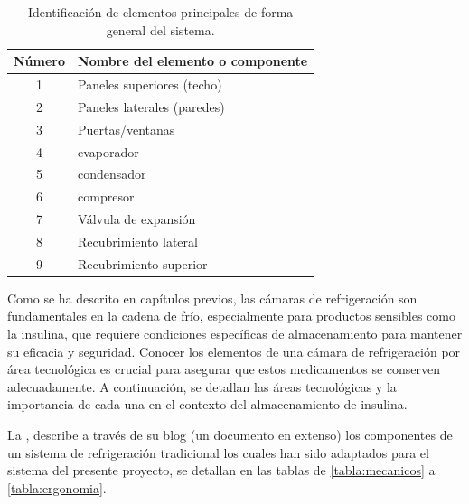 \begin{table}[H]
	\centering
	\caption{Identificación de elementos principales de forma general del sistema.}
	\begin{tabular}{@{}cl@{}}
		\toprule
		\textbf{Número}           & \textbf{Nombre del elemento o componente}           \\
		\midrule
		1                         & Paneles superiores (techo)                          \\
		2                         & Paneles laterales (paredes)                         \\
		3                         & Puertas/ventanas                                    \\
		4                         & evaporador                                          \\
		5                         & condensador                                         \\
		6                         & compresor                                           \\
		7                         & Válvula de expansión                                \\
		8                         & Recubrimiento lateral                               \\
		9                         & Recubrimiento superior                              \\ \bottomrule
	\end{tabular}
	\label{tabla:lista-componentes}
\end{table}

Como se ha descrito en capítulos previos, las cámaras de refrigeración son fundamentales en la cadena de frío, especialmente para productos sensibles como la insulina, que requiere condiciones específicas de almacenamiento para mantener su eficacia y seguridad. Conocer los elementos de una cámara de refrigeración por área tecnológica es crucial para asegurar que estos medicamentos se conserven adecuadamente. A continuación, se detallan las áreas tecnológicas y la importancia de cada una en el contexto del almacenamiento de insulina.
\newpage

La \cite{UG2022}, describe a través de su blog (un documento en extenso) los componentes de un sistema de refrigeración tradicional los cuales han sido adaptados para el sistema del presente proyecto, se detallan en las tablas de \ref{tabla:mecanicos} a \ref{tabla:ergonomia}.



